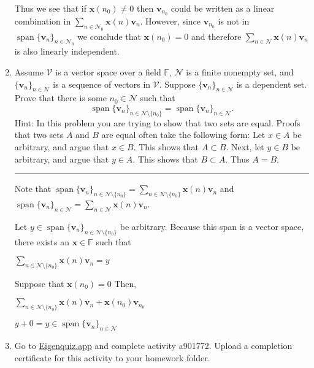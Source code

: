 \documentclass[12pt]{amsart}
\newcommand{\1}{\mathbbm{1}}
\numberwithin{equation}{section}
\numberwithin{Theorem}{section}
\theoremstyle{plain} %
\theoremstyle{definition}
\theoremstyle{remark}
\begin{document}
\begin{enumerate}[1.]
Thus we see that if $\mathbf{x}(n_0)\neq0$ then $\mathbf{v}_{n_{0}}$ could be written as a linear combination in $\sum\limits_{n\in\mathcal{N}_{0}}\mathbf{x}(n)\mathbf{v}_{n}$. 
However, since $\mathbf{v}_{n_{0}}$ is not in $\operatorname{span}\{\mathbf{v}_{n}\}_{n\in\mathcal{N}_{0}}$ we conclude that $\mathbf{x}(n_0)=0$ and therefore $\sum\limits_{n\in\mathcal{N}}\mathbf{x}(n)\mathbf{v}_{n}$ is also linearly independent.



\newpage

\item Assume \(\mathcal{V}\) is a vector space over a field \(\mathbb{F}\), \(\mathcal{N}\) is a finite nonempty set, and \(\{\mathbf{v}_{n}\}_{n\in\mathcal{N}}\) is a sequence of vectors in \(\mathcal{V}\). Suppose \(\{\mathbf{v}_{n}\}_{n\in\mathcal{N}}\) is a dependent set.  Prove that there is some \(n_{0}\in\mathcal{N}\) such that
\[\operatorname{span}\{\mathbf{v}_{n}\}_{n\in\mathcal{N}\setminus\{n_{0}\}} = \operatorname{span}\{\mathbf{v}_{n}\}_{n\in\mathcal{N}}.\]
Hint: In this problem you are trying to show that two sets are equal. Proofs that two sets \(A\) and \(B\) are equal often take the following form: Let \(x\in A\) be arbitrary, and argue that \(x\in B\). This shows that \(A\subset B\). Next, let \(y\in B\) be arbitrary, and argue that \(y\in A\). This shows that \(B\subset A\). Thus \(A=B\). \\
\hrule
\bigskip

Note that 
$ \operatorname{span}\{\mathbf{v}_{n}\}_{n\in\mathcal{N}\setminus\{n_{0}\}} =
\sum\limits_{n\in\mathcal{N}\setminus\{n_0\}}\mathbf{x}(n)\mathbf{v}_{n} $
and 
$ \operatorname{span}\{\mathbf{v}_{n}\}_{n\in\mathcal{N}} = 
 \sum\limits_{n\in\mathcal{N}}\mathbf{x}(n)\mathbf{v}_{n} $.

Let $y\in \operatorname{span}\{\mathbf{v}_{n}\}_{n\in\mathcal{N}\setminus\{n_{0}\}} $ be arbitrary.
Because this span is a vector space, there exists an $\textbf{x}\in\mathbb{F}$ such that

$ \sum\limits_{n\in\mathcal{N}\setminus\{n_0\}}\mathbf{x}(n)\mathbf{v}_{n} = y $

Suppose that $\mathbf{x}(n_0) = 0$ Then,

$ \sum\limits_{n\in\mathcal{N}\setminus\{n_0\}}\mathbf{x}(n)\mathbf{v}_{n} + \mathbf{x}(n_0)\mathbf{v}_{n_0} $

$y+0 = y \in   \operatorname{span}\{\mathbf{v}_{n}\}_{n\in\mathcal{N}} $



\vspace*{\fill}
\item Go to \href{https://eigenquiz.app/}{Eigenquiz.app} and complete activity a901772. Upload a completion certificate for this activity to your homework folder.
\end{enumerate}
\end{document}
